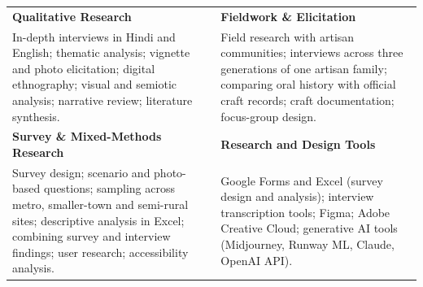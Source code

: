\documentclass[10pt,letterpaper]{article}
\newenvironment{spread}[2][\normalsize]{\par\begingroup\linespread{#2}#1\selectfont}{\par\endgroup}
\begin{document}
\begin{spread}{1.03}
\begin{spread}{1.07}
\ifdefined\EDRES
\newcommand{\skillsThreeHead}{\textbf{Survey \& Mixed-Methods Research}}
\newcommand{\skillsThreeBody}{Survey design; scenario and photo-based questions; sampling across metro, smaller-town and semi-rural sites; descriptive analysis in Excel; combining survey and interview findings; user research; accessibility analysis.}
\else\ifdefined\TEXTILE
\newcommand{\skillsThreeHead}{\textbf{Textile, Craft \& Material Research}}
\newcommand{\skillsThreeBody}{Material studies; field documentation of craft techniques; audits of craft and sustainability claims in fashion product listings; cultural mapping; trend research; competitor analysis; 3D modeling (Blender).}
\else
\newcommand{\skillsThreeHead}{\textbf{Consumer, Cultural \& Market Research}}
\newcommand{\skillsThreeBody}{Cultural mapping; consumer profiling; SWOT; competitor analysis; focus-group design; trend research; e-commerce analysis; integrated marketing (IMC) analysis.}
\fi\fi
\ifdefined\EDRES
\newcommand{\skillsOneHead}{\textbf{Qualitative Research}}
\newcommand{\skillsOneBody}{In-depth interviews in Hindi and English; thematic analysis; vignette and photo elicitation; digital ethnography; visual and semiotic analysis; narrative review; literature synthesis.}
\newcommand{\skillsTwoHead}{\textbf{Fieldwork \& Elicitation}}
\newcommand{\skillsTwoBody}{Field research with artisan communities; interviews across three generations of one artisan family; comparing oral history with official craft records; craft documentation; focus-group design.}
\newcommand{\skillsFourHead}{\textbf{Research and Design Tools}}
\newcommand{\skillsFourBody}{Google Forms and Excel (survey design and analysis); interview transcription tools; Figma; Adobe Creative Cloud; generative AI tools (Midjourney, Runway ML, Claude, OpenAI API).}
\else
\newcommand{\skillsOneHead}{\textbf{HCI, UX, and Accessibility Research}}
\newcommand{\skillsOneBody}{User research; interface analysis \& audits; heuristic evaluation; journey mapping; accessibility analysis; cognitive-load framing; culturally situated UX; e-commerce UX; concept prototyping.}
\newcommand{\skillsTwoHead}{\textbf{Qualitative \& Mixed-Methods Research}}
\newcommand{\skillsTwoBody}{Interviews; thematic analysis; survey design; vignette and photo elicitation; digital ethnography; field research; narrative review; literature synthesis; visual and semiotic analysis.}
\newcommand{\skillsFourHead}{\textbf{Research, Design, and AI Tools}}
\newcommand{\skillsFourBody}{Google Forms and Excel (survey design and analysis); interview transcription tools; Figma; Adobe Creative Cloud; Character Animator; Canva; Midjourney; Runway ML; Leonardo AI; Adobe Sensei; Claude; OpenAI API.}
\fi
\begin{tabularx}{\linewidth}{@{}>{\raggedright\arraybackslash}X >{\raggedright\arraybackslash}X@{}}
\skillsOneHead & \skillsTwoHead \\
\small \skillsOneBody
&
\small \skillsTwoBody \\ \noalign{\vspace{4pt}}
\skillsThreeHead & \skillsFourHead \\
\small \skillsThreeBody
&
\small \skillsFourBody
\end{tabularx}


\end{spread}
\end{spread}
\end{document}
